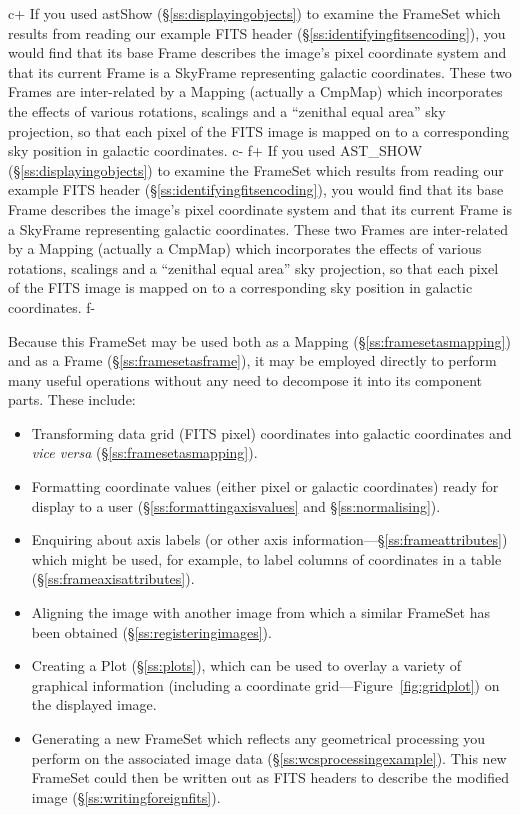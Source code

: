 \documentclass[twoside,11pt]{starlink}
\providecommand{\secref}[1]{\S\ref{#1}}
\begin{document}
c+
If you used astShow (\secref{ss:displayingobjects}) to examine the
FrameSet which results from reading our example FITS header
(\secref{ss:identifyingfitsencoding}), you would find that its base
Frame describes the image's pixel coordinate system and that its
current Frame is a SkyFrame representing galactic coordinates. These
two Frames are inter-related by a Mapping (actually a CmpMap) which
incorporates the effects of various rotations, scalings and a
``zenithal equal area'' sky projection, so that each pixel of the FITS
image is mapped on to a corresponding sky position in galactic
coordinates.
c-
f+
If you used AST\_SHOW (\secref{ss:displayingobjects}) to examine the
FrameSet which results from reading our example FITS header
(\secref{ss:identifyingfitsencoding}), you would find that its base
Frame describes the image's pixel coordinate system and that its
current Frame is a SkyFrame representing galactic coordinates. These
two Frames are inter-related by a Mapping (actually a CmpMap) which
incorporates the effects of various rotations, scalings and a
``zenithal equal area'' sky projection, so that each pixel of the FITS
image is mapped on to a corresponding sky position in galactic
coordinates.
f-

Because this FrameSet may be used both as a Mapping
(\secref{ss:framesetasmapping}) and as a Frame
(\secref{ss:framesetasframe}), it may be employed directly to perform
many useful operations without any need to decompose it into its
component parts. These include:

\begin{itemize}
\item Transforming data grid (FITS pixel) coordinates into galactic
coordinates and \emph{vice versa} (\secref{ss:framesetasmapping}).

\item Formatting coordinate values (either pixel or galactic
coordinates) ready for display to a user
(\secref{ss:formattingaxisvalues} and \secref{ss:normalising}).

\item Enquiring about axis labels (or other axis
information---\secref{ss:frameattributes}) which might be used, for
example, to label columns of coordinates in a table
(\secref{ss:frameaxisattributes}).

\item Aligning the image with another image from which a similar
FrameSet has been obtained (\secref{ss:registeringimages}).

\item Creating a Plot (\secref{ss:plots}), which can be used to overlay
a variety of graphical information (including a coordinate
grid---Figure~\ref{fig:gridplot}) on the displayed image.

\item Generating a new FrameSet which reflects any geometrical
processing you perform on the associated image data
(\secref{ss:wcsprocessingexample}). This new FrameSet could then be
written out as FITS headers to describe the modified image
(\secref{ss:writingforeignfits}).
\end{itemize}
\end{document}
